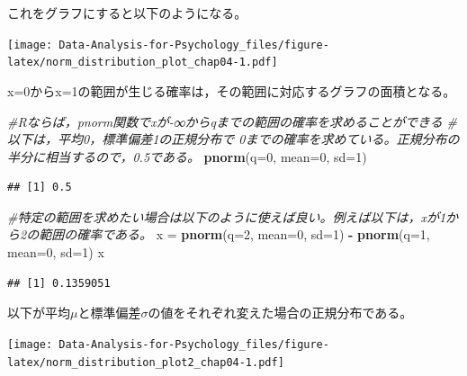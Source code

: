 \documentclass[]{article}
\newenvironment{Shaded}{\begin{snugshade}}{\end{snugshade}}
\newcommand{\KeywordTok}[1]{\textcolor[rgb]{0.13,0.29,0.53}{\textbf{#1}}}
\newcommand{\DataTypeTok}[1]{\textcolor[rgb]{0.13,0.29,0.53}{#1}}
\newcommand{\DecValTok}[1]{\textcolor[rgb]{0.00,0.00,0.81}{#1}}
\newcommand{\StringTok}[1]{\textcolor[rgb]{0.31,0.60,0.02}{#1}}
\newcommand{\CommentTok}[1]{\textcolor[rgb]{0.56,0.35,0.01}{\textit{#1}}}
\newcommand{\OperatorTok}[1]{\textcolor[rgb]{0.81,0.36,0.00}{\textbf{#1}}}
\newcommand{\NormalTok}[1]{#1}
\begin{document}
これをグラフにすると以下のようになる。

\texttt{[image: Data-Analysis-for-Psychology\_files/figure-latex/norm\_distribution\_plot\_chap04-1.pdf]}

x=0からx=1の範囲が生じる確率は，その範囲に対応するグラフの面積となる。

\begin{Shaded}
\begin{Highlighting}[]
\CommentTok{#Rならば，pnorm関数でxが-∞からqまでの範囲の確率を求めることができる}
\CommentTok{#以下は，平均0，標準偏差1の正規分布で 0までの確率を求めている。正規分布の半分に相当するので，0.5である。}
\KeywordTok{pnorm}\NormalTok{(}\DataTypeTok{q=}\DecValTok{0}\NormalTok{, }\DataTypeTok{mean=}\DecValTok{0}\NormalTok{, }\DataTypeTok{sd=}\DecValTok{1}\NormalTok{)}
\end{Highlighting}
\end{Shaded}

\begin{verbatim}
## [1] 0.5
\end{verbatim}

\begin{Shaded}
\begin{Highlighting}[]
\CommentTok{#特定の範囲を求めたい場合は以下のように使えば良い。例えば以下は，xが1から2の範囲の確率である。}
\NormalTok{x =}\StringTok{ }\KeywordTok{pnorm}\NormalTok{(}\DataTypeTok{q=}\DecValTok{2}\NormalTok{, }\DataTypeTok{mean=}\DecValTok{0}\NormalTok{, }\DataTypeTok{sd=}\DecValTok{1}\NormalTok{) }\OperatorTok{-}\StringTok{ }\KeywordTok{pnorm}\NormalTok{(}\DataTypeTok{q=}\DecValTok{1}\NormalTok{, }\DataTypeTok{mean=}\DecValTok{0}\NormalTok{, }\DataTypeTok{sd=}\DecValTok{1}\NormalTok{) }
\NormalTok{x}
\end{Highlighting}
\end{Shaded}

\begin{verbatim}
## [1] 0.1359051
\end{verbatim}

以下が平均\(\mu\)と標準偏差\(\sigma\)の値をそれぞれ変えた場合の正規分布である。

\texttt{[image: Data-Analysis-for-Psychology\_files/figure-latex/norm\_distribution\_plot2\_chap04-1.pdf]}
\end{document}
